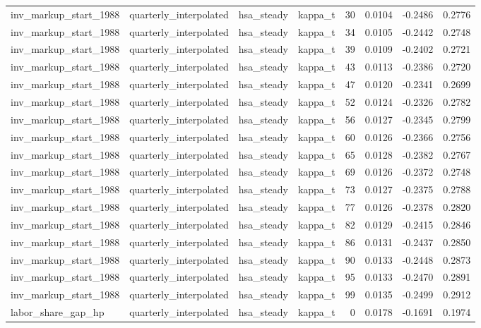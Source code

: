 \begin{tabular}{llllrrrr}
inv\_markup\_start\_1988 & quarterly\_interpolated & hsa\_steady & kappa\_t & 30 & 0.0104 & -0.2486 & 0.2776 \\
inv\_markup\_start\_1988 & quarterly\_interpolated & hsa\_steady & kappa\_t & 34 & 0.0105 & -0.2442 & 0.2748 \\
inv\_markup\_start\_1988 & quarterly\_interpolated & hsa\_steady & kappa\_t & 39 & 0.0109 & -0.2402 & 0.2721 \\
inv\_markup\_start\_1988 & quarterly\_interpolated & hsa\_steady & kappa\_t & 43 & 0.0113 & -0.2386 & 0.2720 \\
inv\_markup\_start\_1988 & quarterly\_interpolated & hsa\_steady & kappa\_t & 47 & 0.0120 & -0.2341 & 0.2699 \\
inv\_markup\_start\_1988 & quarterly\_interpolated & hsa\_steady & kappa\_t & 52 & 0.0124 & -0.2326 & 0.2782 \\
inv\_markup\_start\_1988 & quarterly\_interpolated & hsa\_steady & kappa\_t & 56 & 0.0127 & -0.2345 & 0.2799 \\
inv\_markup\_start\_1988 & quarterly\_interpolated & hsa\_steady & kappa\_t & 60 & 0.0126 & -0.2366 & 0.2756 \\
inv\_markup\_start\_1988 & quarterly\_interpolated & hsa\_steady & kappa\_t & 65 & 0.0128 & -0.2382 & 0.2767 \\
inv\_markup\_start\_1988 & quarterly\_interpolated & hsa\_steady & kappa\_t & 69 & 0.0126 & -0.2372 & 0.2748 \\
inv\_markup\_start\_1988 & quarterly\_interpolated & hsa\_steady & kappa\_t & 73 & 0.0127 & -0.2375 & 0.2788 \\
inv\_markup\_start\_1988 & quarterly\_interpolated & hsa\_steady & kappa\_t & 77 & 0.0126 & -0.2378 & 0.2820 \\
inv\_markup\_start\_1988 & quarterly\_interpolated & hsa\_steady & kappa\_t & 82 & 0.0129 & -0.2415 & 0.2846 \\
inv\_markup\_start\_1988 & quarterly\_interpolated & hsa\_steady & kappa\_t & 86 & 0.0131 & -0.2437 & 0.2850 \\
inv\_markup\_start\_1988 & quarterly\_interpolated & hsa\_steady & kappa\_t & 90 & 0.0133 & -0.2448 & 0.2873 \\
inv\_markup\_start\_1988 & quarterly\_interpolated & hsa\_steady & kappa\_t & 95 & 0.0133 & -0.2470 & 0.2891 \\
inv\_markup\_start\_1988 & quarterly\_interpolated & hsa\_steady & kappa\_t & 99 & 0.0135 & -0.2499 & 0.2912 \\
labor\_share\_gap\_hp & quarterly\_interpolated & hsa\_steady & kappa\_t & 0 & 0.0178 & -0.1691 & 0.1974 \\

\end{tabular}
